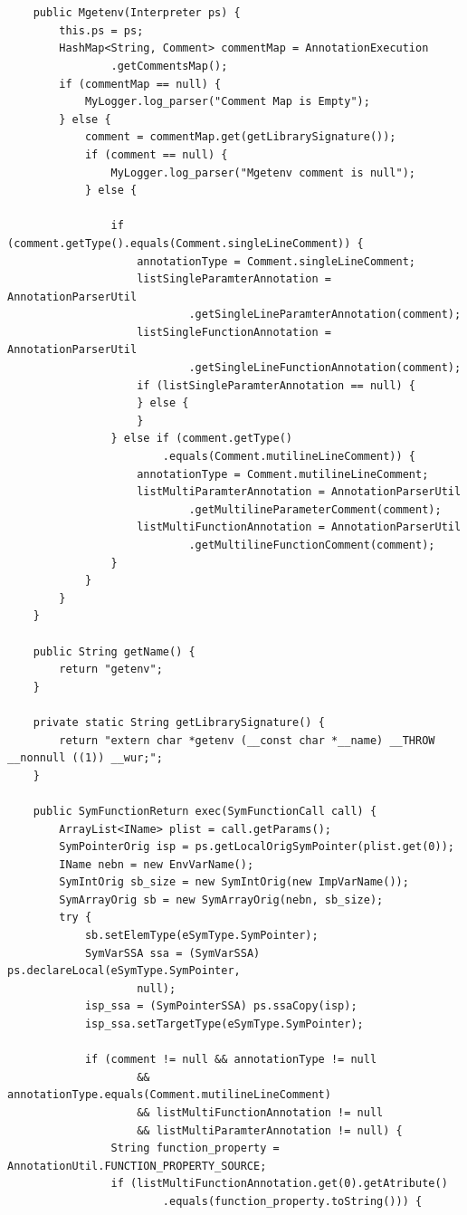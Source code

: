 \begin{lstlisting}[caption={Function model of getenv()},label={lst:getenv()}]


	public Mgetenv(Interpreter ps) {
		this.ps = ps;
		HashMap<String, Comment> commentMap = AnnotationExecution
				.getCommentsMap();
		if (commentMap == null) {
			MyLogger.log_parser("Comment Map is Empty");
		} else {
			comment = commentMap.get(getLibrarySignature());
			if (comment == null) {
				MyLogger.log_parser("Mgetenv comment is null");
			} else {

				if (comment.getType().equals(Comment.singleLineComment)) {
					annotationType = Comment.singleLineComment;
					listSingleParamterAnnotation = AnnotationParserUtil
							.getSingleLineParamterAnnotation(comment);
					listSingleFunctionAnnotation = AnnotationParserUtil
							.getSingleLineFunctionAnnotation(comment);
					if (listSingleParamterAnnotation == null) {
					} else {
					}
				} else if (comment.getType()
						.equals(Comment.mutilineLineComment)) {
					annotationType = Comment.mutilineLineComment;
					listMultiParamterAnnotation = AnnotationParserUtil
							.getMultilineParameterComment(comment);
					listMultiFunctionAnnotation = AnnotationParserUtil
							.getMultilineFunctionComment(comment);
				}
			}
		}
	}

	public String getName() {
		return "getenv";
	}

	private static String getLibrarySignature() {
		return "extern char *getenv (__const char *__name) __THROW __nonnull ((1)) __wur;";
	}

	public SymFunctionReturn exec(SymFunctionCall call) {
		ArrayList<IName> plist = call.getParams();
		SymPointerOrig isp = ps.getLocalOrigSymPointer(plist.get(0));
		IName nebn = new EnvVarName();
		SymIntOrig sb_size = new SymIntOrig(new ImpVarName());
		SymArrayOrig sb = new SymArrayOrig(nebn, sb_size);
		try {
			sb.setElemType(eSymType.SymPointer);
			SymVarSSA ssa = (SymVarSSA) ps.declareLocal(eSymType.SymPointer,
					null);
			isp_ssa = (SymPointerSSA) ps.ssaCopy(isp);
			isp_ssa.setTargetType(eSymType.SymPointer);

			if (comment != null && annotationType != null
					&& annotationType.equals(Comment.mutilineLineComment)
					&& listMultiFunctionAnnotation != null
					&& listMultiParamterAnnotation != null) {
				String function_property = AnnotationUtil.FUNCTION_PROPERTY_SOURCE;
				if (listMultiFunctionAnnotation.get(0).getAtribute()
						.equals(function_property.toString())) {
					

\end{lstlisting}
